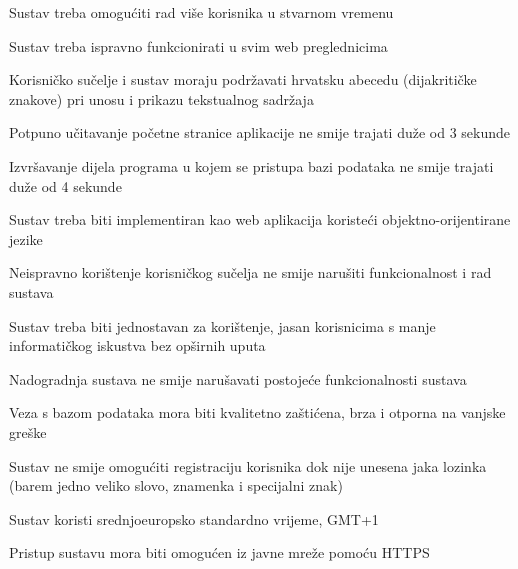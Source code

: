 			\begin{packed_item}
	
				\item Sustav treba omogućiti rad više korisnika u stvarnom vremenu
				\item Sustav treba ispravno funkcionirati u svim web preglednicima
				\item Korisničko sučelje i sustav moraju podržavati hrvatsku abecedu (dijakritičke znakove) pri unosu i prikazu tekstualnog sadržaja
				\item Potpuno učitavanje početne stranice aplikacije ne smije trajati duže od 3 sekunde
				\item Izvršavanje dijela programa u kojem se pristupa bazi podataka ne smije trajati duže od 4 sekunde
				\item Sustav treba biti implementiran kao web aplikacija koristeći objektno-orijentirane jezike
				\item Neispravno korištenje korisničkog sučelja ne smije narušiti funkcionalnost i rad sustava
				\item Sustav treba biti jednostavan za korištenje, jasan korisnicima s manje informatičkog iskustva bez opširnih uputa
				\item Nadogradnja sustava ne smije narušavati postojeće funkcionalnosti sustava
				\item Veza s bazom podataka mora biti kvalitetno zaštićena, brza i otporna na vanjske greške
				\item Sustav ne smije omogućiti registraciju korisnika dok nije unesena jaka lozinka (barem jedno veliko slovo, znamenka i specijalni znak)
				\item Sustav koristi srednjoeuropsko standardno vrijeme, GMT+1 
				\item Pristup sustavu mora biti omogućen iz javne mreže pomoću HTTPS
			\end{packed_item}
			 
			 
			 
	